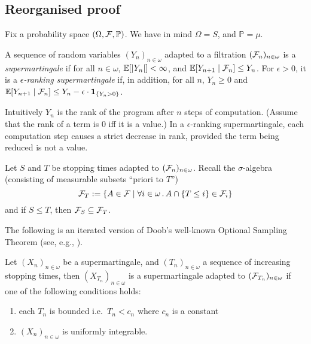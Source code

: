 \subsection*{Reorganised proof}

Fix a probability space $(\Omega, \mathcal{F}, \mathbb{P})$. 
We have in mind $\Omega = S$, and $\mathbb{P} = \mu$.

\begin{definition}\rm
A sequence of random variables $(Y_n)_{n \in \omega}$ adapted to a filtration $(\mathcal{F}_n)_{n \in \omega}$ is a \emph{supermartingale} if for all $n \in \omega$, $\mathbb{E}[|Y_n|] < \infty$, and $\mathbb{E}[Y_{n+1} \mid \mathcal{F}_n] \leq Y_n$.
For $\epsilon > 0$, it is a \emph{$\epsilon$-ranking supermartingale} if, in addition, for all $n$, $Y_n \geq 0$ and $\mathbb{E}[Y_{n+1} \mid \mathcal{F}_n] \leq Y_n - \epsilon \cdot \mathbf{1}_{\{Y_n > 0\}}$.
\citep{DBLP:conf/popl/FioritiH15,DBLP:conf/popl/ChatterjeeFNH16}
\end{definition}

Intuitively $Y_n$ is the rank of the program after $n$ steps of computation.
(Assume that the rank of a term is 0 iff it is a value.) In a $\epsilon$-ranking supermartingale, each computation step causes a strict decrease in rank, provided the term being reduced is not a value.

Let $S$ and $T$ be stopping times adapted to $(\mathcal{F}_n)_{n \in \omega}$.
Recall the $\sigma$-algebra (consisting of measurable subsets ``priori to $T$'')
\[
\mathcal{F}_T := \{A \in \mathcal{F} \mid \forall i \in \omega \, . \, A \cap \{T \leq i\} \in \mathcal{F}_i\}
\]
and if $S \leq T$, then $\mathcal{F}_S \subseteq \mathcal{F}_{T}$.

The following is an iterated version of Doob's well-known Optional Sampling Theorem (see, e.g., \cite[\S 6.7]{AshDD00}).
\begin{theorem}
\label{thm:optional sampling}
Let $(X_n)_{n\in \omega}$ be a supermartingale, and $(T_n)_{n \in \omega}$ a sequence of increasing stopping times, then $(X_{T_n})_{n \in \omega}$ is a supermartingale adapted to $(\mathcal{F}_{T_n})_{n \in \omega}$ if one of the following conditions holds:
\begin{enumerate}
\item each $T_n$ is bounded i.e.~$T_n < c_n$ where $c_n$ is a constant
\item $(X_n)_{n\in \omega}$ is uniformly integrable.
\end{enumerate}
\end{theorem}

